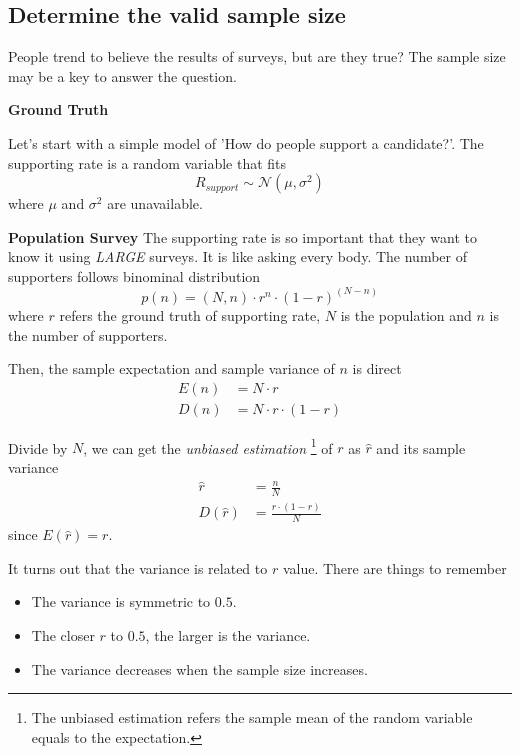 \documentclass[../main.tex]{subfiles}
\begin{document}
\subsection{Determine the valid sample size}

People trend to believe the results of surveys, but are they true?
The sample size may be a key to answer the question.

\bigbreak
\textbf{Ground Truth}

Let's start with a simple model of 'How do people support a candidate?'.
The supporting rate is a random variable that fits
\begin{equation*}
    R_{support} \sim \mathcal{N}(\mu, \sigma^2)
\end{equation*}
where $\mu$ and $\sigma^2$ are unavailable.

\bigbreak
\textbf{Population Survey}
The supporting rate is so important that they want to know it using \emph{LARGE} surveys.
It is like asking every body.
The number of supporters follows binominal distribution
\begin{equation*}
    p(n) = (N, n) \cdot r^n \cdot (1-r)^(N-n)
\end{equation*}
where $r$ refers the ground truth of supporting rate, $N$ is the population and $n$ is the number of supporters.

Then, the sample expectation and sample variance of $n$ is direct
\begin{align}
    E(n) & = N \cdot r             \\
    D(n) & = N \cdot r \cdot (1-r)
\end{align}

Divide by $N$, we can get the \emph{unbiased estimation} \footnote{The unbiased estimation refers the sample mean of the random variable equals to the expectation.} of $r$ as $\hat{r}$ and its sample variance
\begin{align}
    \hat{r}    & = \frac{n}{N}             \\
    D(\hat{r}) & = \frac{r \cdot (1-r)}{N}
\end{align}
since $E(\hat{r})=r$.

It turns out that the variance is related to $r$ value.
There are things to remember
\begin{itemize}
    \item The variance is symmetric to $0.5$.
    \item The closer $r$ to $0.5$, the larger is the variance.
    \item The variance decreases when the sample size increases.
\end{itemize}
\end{document}
